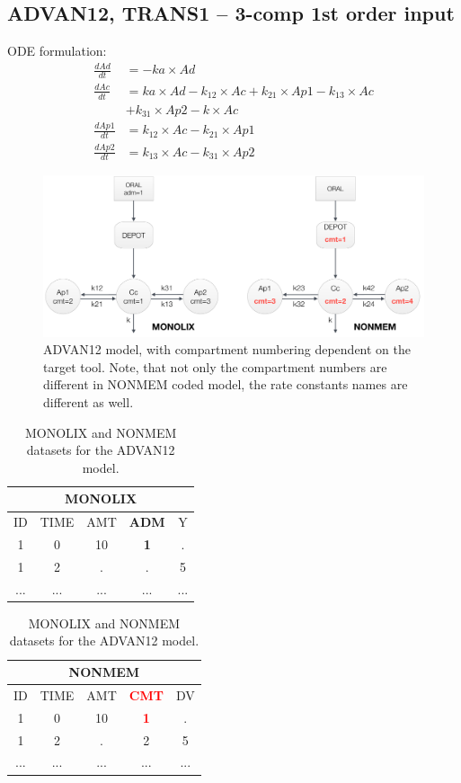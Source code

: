 \subsection{ADVAN12, TRANS1 -- 3-comp 1st order input}
\label{subsubsec:ADVAN12}
ODE formulation:
\begin{align}
\frac{dAd}{dt} & =  -ka \times Ad \nonumber \\
\frac{dAc}{dt} & = ka \times Ad - k_{12} \times Ac + k_{21} \times Ap1 - k_{13} \times Ac \nonumber \\
			& + k_{31} \times Ap2 - k \times Ac  \nonumber \\
\frac{dAp1}{dt} & =  k_{12} \times Ac - k_{21} \times Ap1  \nonumber \\
\frac{dAp2}{dt} & =  k_{13} \times Ac - k_{31} \times Ap2  \nonumber
\end{align}

\begin{figure}[htbp!]
\centering
 \includegraphics[width=160mm]{pics/Advan12.pdf}
\caption{ADVAN12 model, with compartment numbering dependent on the target tool. 
Note, that not only the compartment numbers are different in NONMEM coded model, 
the rate constants names are different as well.}
\label{fig:Advan12}
\end{figure}


\begin{table}[ht!]
\footnotesize
\parbox{.5\linewidth}{
\centering
\begin{tabular}{ccccc}
  \hline
   \multicolumn{5}{c}{\textbf{MONOLIX}} \\
  \hline
ID & TIME & AMT & \textbf{ADM} & Y \\
  \hline
1  & 0        & 10   & \textbf{1} & .       \\
1  & 2        & .      & . 	& 5        \\
... &  ...      &  ...   &  ...  &  ...     \\
\end{tabular}
}
\hfill
\parbox{.5\linewidth}{
\centering
\begin{tabular}{ccccc}
  \hline
   \multicolumn{5}{c}{\textbf{NONMEM}} \\
  \hline
ID & TIME & AMT & \textbf{\textcolor{red}{CMT}} & DV \\
  \hline
1  & 0        & 10   & \textbf{\textcolor{red}{1}}   & .    \\
1  & 2        & .      & 2    & 5   \\
... &  ...      &  ...   &  ... & ...  \\
\end{tabular}
}
\caption{MONOLIX and NONMEM datasets for the ADVAN12 model.}
\end{table}


